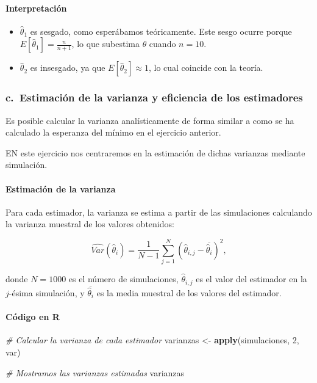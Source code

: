 \documentclass[
]{article}
\newenvironment{Shaded}{\begin{snugshade}}{\end{snugshade}}
\newcommand{\CommentTok}[1]{\textcolor[rgb]{0.56,0.35,0.01}{\textit{#1}}}
\newcommand{\DecValTok}[1]{\textcolor[rgb]{0.00,0.00,0.81}{#1}}
\newcommand{\FunctionTok}[1]{\textcolor[rgb]{0.13,0.29,0.53}{\textbf{#1}}}
\newcommand{\NormalTok}[1]{#1}
\newcommand{\OtherTok}[1]{\textcolor[rgb]{0.56,0.35,0.01}{#1}}
\providecommand{\tightlist}{%
  \setlength{\itemsep}{0pt}\setlength{\parskip}{0pt}}
\begin{document}
\paragraph{Interpretación}\label{interpretaciuxf3n}

\begin{itemize}
\tightlist
\item
  \(\hat{\theta}_1\) es sesgado, como esperábamos teóricamente. Este sesgo ocurre porque \(E[\hat{\theta}_1] = \frac{n}{n+1}\), lo que subestima \(\theta\) cuando \(n = 10\).
\item
  \(\hat{\theta}_2\) es insesgado, ya que \(E[\hat{\theta}_2] \approx 1\), lo cual coincide con la teoría.
\end{itemize}

\subsubsection{c.~Estimación de la varianza y eficiencia de los estimadores}\label{c.-estimaciuxf3n-de-la-varianza-y-eficiencia-de-los-estimadores}

Es posible calcular la varianza analísticamente de forma similar a como se ha calculado la esperanza del mínimo en el ejercicio anterior.

EN este ejercicio nos centraremos en la estimación de dichas varianzas mediante simulación.

\paragraph{Estimación de la varianza}\label{estimaciuxf3n-de-la-varianza}

Para cada estimador, la varianza se estima a partir de las simulaciones calculando la varianza muestral de los valores obtenidos:

\[
\widehat{Var}(\hat{\theta}_i) = \frac{1}{N-1} \sum_{j=1}^{N} (\hat{\theta}_{i,j} - \overline{\hat{\theta}_i})^2,
\]

donde \(N = 1000\) es el número de simulaciones, \(\hat{\theta}_{i,j}\) es el valor del estimador en la \(j\)-ésima simulación, y \(\overline{\hat{\theta}_i}\) es la media muestral de los valores del estimador.

\paragraph{Código en R}\label{cuxf3digo-en-r-1}

\begin{Shaded}
\begin{Highlighting}[]
\CommentTok{\# Calcular la varianza de cada estimador}
\NormalTok{varianzas }\OtherTok{\textless{}{-}} \FunctionTok{apply}\NormalTok{(simulaciones, }\DecValTok{2}\NormalTok{, var)}

\CommentTok{\# Mostramos las varianzas estimadas}
\NormalTok{varianzas}
\end{Highlighting}
\end{Shaded}
\end{document}
